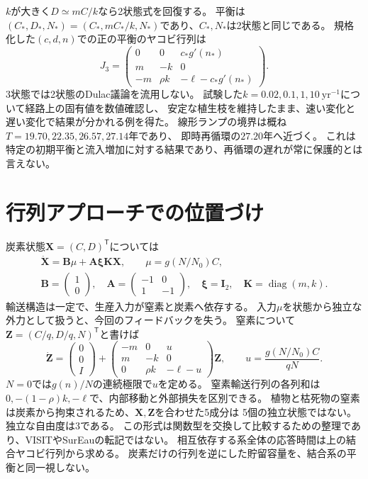 \documentclass[a4paper,11pt]{ltjsarticle}
\begin{document}
$k$が大きく$D\simeq mC/k$なら2状態式を回復する。
平衡は$(C_*,D_*,N_*)=(C_*,mC_*/k,N_*)$であり、$C_*,N_*$は2状態と同じである。
規格化した$(c,d,n)$での正の平衡のヤコビ行列は
\begin{equation}
J_3=\begin{pmatrix}
0&0&c_*g'(n_*)\\m&-k&0\\-m&\rho k&-\ell-c_*g'(n_*)
\end{pmatrix}.
\end{equation}
3状態では2状態のDulac議論を流用しない。
試験した$k=0.02,0.1,1,10\ \mathrm{yr^{-1}}$について経路上の固有値を数値確認し、
安定な植生枝を維持したまま、速い変化と遅い変化で結果が分かれる例を得た。
線形ランプの境界は概ね$T=19.70,22.35,26.57,27.14$年であり、
即時再循環の$27.20$年へ近づく。
これは特定の初期平衡と流入増加に対する結果であり、再循環の遅れが常に保護的とは言えない。

\section{行列アプローチでの位置づけ}
炭素状態$\bm X=(C,D)^\mathsf T$については
\begin{equation}
\begin{gathered}
\dot{\bm X}=\bm B\mu+\bm A\bm\xi\bm K\bm X,\qquad\mu=g(N/N_0)C,\\
\bm B=\begin{pmatrix}1\\0\end{pmatrix},\quad
\bm A=\begin{pmatrix}-1&0\\1&-1\end{pmatrix},\quad
\bm\xi=\bm I_2,\quad\bm K=\operatorname{diag}(m,k).
\end{gathered}
\end{equation}
輸送構造は一定で、生産入力が窒素と炭素へ依存する。
入力$\mu$を状態から独立な外力として扱うと、今回のフィードバックを失う。
窒素について$\bm Z=(C/q,D/q,N)^\mathsf T$と書けば
\begin{equation}
\dot{\bm Z}=\begin{pmatrix}0\\0\\I\end{pmatrix}+
\begin{pmatrix}
-m&0&u\\m&-k&0\\0&\rho k&-\ell-u
\end{pmatrix}\bm Z,\qquad
u=\frac{g(N/N_0)C}{qN}.
\end{equation}
$N=0$では$g(n)/N$の連続極限で$u$を定める。
窒素輸送行列の各列和は$0,-(1-\rho)k,-\ell$で、内部移動と外部損失を区別できる。
植物と枯死物の窒素は炭素から拘束されるため、$\bm X,\bm Z$を合わせた5成分は
5個の独立状態ではない。独立な自由度は3である。
この形式は関数型を交換して比較するための整理であり、VISITやSurEauの転記ではない。
相互依存する系全体の応答時間は上の結合ヤコビ行列から求める。
炭素だけの行列を逆にした貯留容量を、結合系の平衡と同一視しない。
\end{document}
